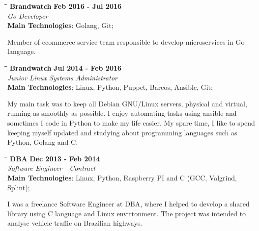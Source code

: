 \documentclass[margin]{res}
\begin{document}
\begin{resume}
\vspace{-0.1in}
   \begin{tabbing}
   \hspace{2.3in}\= \hspace{1.7in}\= \kill
    \textbf{Brandwatch}    \>\>\textbf{Feb 2016 - Jul 2016}\\
    \textit{Go Developer}\\        
    \textbf{Main Technologies}: Golang, Git;
   \end{tabbing}\vspace{-20pt}
    \vspace{2mm}
Member of ecommerce service team responsible to develop microservices in Go language.

\vspace{-0.1in}
   \begin{tabbing}
   \hspace{2.3in}\= \hspace{1.7in}\= \kill %
    \textbf{Brandwatch}    \>\>\textbf{Jul 2014 - Feb 2016}\\
    \textit{Junior Linux Systems Administrator}\\        
    \textbf{Main Technologies}: Linux, Python, Puppet, Bareos, Ansible, Git;
   \end{tabbing}\vspace{-20pt}      %
    \vspace{2mm}
My main task was to keep all Debian GNU/Linux servers, physical and virtual, running as smoothly as possible.
I enjoy automating tasks using ansible and sometimes I code in Python to make my life easier.
My spare time, I like to spend keeping myself updated and studying about programming languages such as Python, Golang and C.


\vspace{-0.1in}
   \begin{tabbing}
   \hspace{2.3in}\= \hspace{1.7in}\= \kill %
    \textbf{DBA}    \>\>\textbf{Dec 2013 - Feb 2014}\\
    \textit{Software Engineer - Contract}\\        
    \textbf{Main Technologies}: Linux, Python, Raspberry PI and C (GCC, Valgrind, Splint);
   \end{tabbing}\vspace{-20pt}      %
    \vspace{2mm}
        I was a freelance Software Engineer at DBA, where I helped to develop
        a shared library using C language and Linux envirtonment. The project was intended to 
        analyse vehicle traffic on Brazilian highways.


\end{resume}
\end{document}
